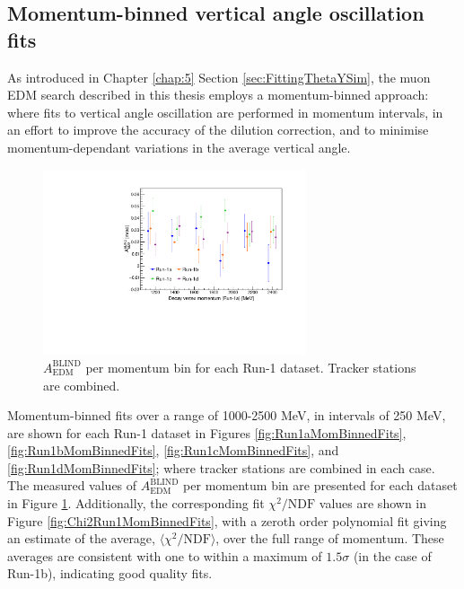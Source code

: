 \subsection{Momentum-binned vertical angle oscillation fits}

As introduced in Chapter \ref{chap:5} Section \ref{sec:FittingThetaYSim}, the muon EDM search described in this thesis employs a momentum-binned approach: where fits to vertical angle oscillation are performed in momentum intervals, in an effort to improve the accuracy of the dilution correction, and to minimise momentum-dependant variations in the average vertical angle. 


\begin{figure}[b!]
\centering{}
\includegraphics[trim={0 0 0 0},clip,width=0.69\textwidth]{Images/Chapter6/S12S18_AEDM_vs_p_overlay_1000_2500.pdf}
\caption{$A_{\text{EDM}}^{\text{BLIND}}$ per momentum bin for each Run-1 dataset. Tracker stations are combined.}
\label{fig:Run1AEDM}
\end{figure} 

Momentum-binned fits over a range of 1000-2500 MeV, in intervals of 250 MeV, are shown for each Run-1 dataset in Figures \ref{fig:Run1aMomBinnedFits}, \ref{fig:Run1bMomBinnedFits}, \ref{fig:Run1cMomBinnedFits}, and \ref{fig:Run1dMomBinnedFits}; where tracker stations are combined in each case. The measured values of $A_{\text{EDM}}^{\text{BLIND}}$ per momentum bin are presented for each dataset in Figure \ref{fig:Run1AEDM}. Additionally, the corresponding fit $\chi^{2}/\text{NDF}$ values are shown in Figure \ref{fig:Chi2Run1MomBinnedFits}, with a zeroth order polynomial fit giving an estimate of the average, $\langle \chi^{2}/\text{NDF} \rangle$, over the full range of momentum. These averages are consistent with one to within a maximum of $1.5\sigma$ (in the case of Run-1b), indicating good quality fits. 

